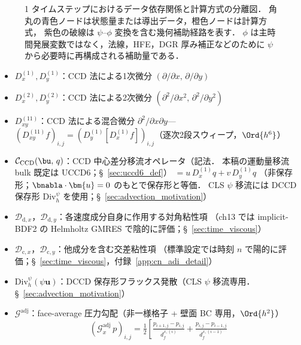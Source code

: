 \begin{figure}[htbp]
{\begin{tikzpicture}
\end{tikzpicture}%
}
\caption{1 タイムステップにおけるデータ依存関係と計算方式の分離図．
角丸の青色ノードは状態量または導出データ，橙色ノードは計算方式，
紫色の破線は $\psi$--$\phi$ 変換を含む幾何補助経路を表す．
$\phi$ は主時間発展変数ではなく，法線，HFE，DGR 厚み補正などのために
$\psi$ から必要時に再構成される補助量である．}
\label{fig:algo_data_method_flow}
\end{figure}

\begin{tcolorbox}[defbox, title={本章で用いる離散演算子の記法}]
\label{box:operator_notation}
\begin{itemize}[noitemsep]
  \item $D_x^{(1)}, D_y^{(1)}$：CCD 法による1次微分 $(\partial/\partial x,\, \partial/\partial y)$
  \item $D_x^{(2)}, D_y^{(2)}$：CCD 法による2次微分 $(\partial^2/\partial x^2,\, \partial^2/\partial y^2)$
  \item $D_{xy}^{(11)}$：CCD 法による混合微分 $\partial^2/\partial x\partial y$—
        $(D_{xy}^{(11)} f)_{i,j} = (D_y^{(1)}[D_x^{(1)} f])_{i,j}$（逐次2段スウィープ，$\Ord{h^6}$）
  \item $\mathcal{C}_{\text{CCD}}(\bu,\, q)$：CCD 中心差分移流オペレータ（記法．
          本稿の運動量移流 bulk 既定は UCCD6；§~\ref{sec:uccd6_def}）
          $= u\,D_x^{(1)} q + v\,D_y^{(1)} q$
          （非保存形；$\bnabla\cdot\bm{u}=0$ のもとで保存形と等価．
          CLS $\psi$ 移流には DCCD 保存形 $\mathrm{Div}_h^{\psi}$ を使用；§~\ref{sec:advection_motivation}）
  \item $\mathcal{D}_{\mathrm{d},x}$，$\mathcal{D}_{\mathrm{d},y}$：各速度成分自身に作用する対角粘性項
        （ch13 では implicit-BDF2 の Helmholtz GMRES で陰的に評価；§~\ref{sec:time_viscous}）
  \item $\mathcal{D}_{\mathrm{c},x}$，$\mathcal{D}_{\mathrm{c},y}$：他成分を含む交差粘性項
        （標準設定では時刻 $n$ で陽的に評価；§~\ref{sec:time_viscous}，付録~\ref{app:cn_adi_detail}）
  \item $\mathrm{Div}_h^{\psi}(\psi\bm{u})$：DCCD 保存形フラックス発散（CLS $\psi$ 移流専用．§~\ref{sec:advection_motivation}）
  \item $\mathcal{G}^\text{adj}$：face-average 圧力勾配（非一様格子 + 壁面 BC 専用，$\Ord{h^2}$）
          \[
            (\mathcal{G}^\text{adj}_x\, p)_{i,j}
            = \tfrac{1}{2}\!\left[
                \tfrac{p_{i+1,j}-p_{i,j}}{d_f^{x,(i)}}
              + \tfrac{p_{i,j}-p_{i-1,j}}{d_f^{x,(i-1)}}
\]
\end{itemize}
\end{tcolorbox}
